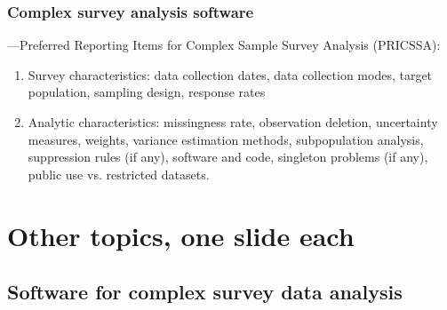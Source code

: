 \documentclass[handout]{beamer}
\begin{document}
\begin{frame}\frametitle{Complex survey analysis software}

\citet{seid:west:moser:2023}---Preferred Reporting Items 
for Complex Sample Survey Analysis (PRICSSA):

\begin{enumerate}
	\item Survey characteristics: data collection dates, data collection modes, 
	      target population, sampling design, response rates \citep{aapor:2016:standard:definitions}
   \item Analytic characteristics: missingness rate, observation deletion, uncertainty measures,
         weights, variance estimation methods, subpopulation analysis, suppression rules (if any),
         software and code, singleton problems (if any), public use vs. restricted datasets.
\end{enumerate}

\end{frame}

\section{Other topics, one slide each}

\subsection{Software for complex survey data analysis}
\end{document}
